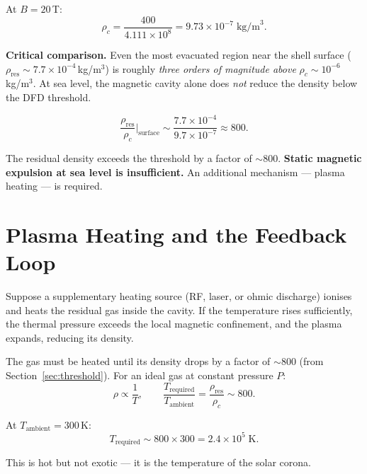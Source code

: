 \documentclass[12pt,a4paper]{article}
\begin{document}
At $B = 20$\,T:
\begin{equation}
  \rho_c = \frac{400}{4.111 \times 10^8} = 9.73 \times 10^{-7} \; \text{kg/m}^3.
\end{equation}

\textbf{Critical comparison.}  Even the most evacuated region near the shell surface
($\rho_{\text{res}} \sim 7.7 \times 10^{-4}$\,kg/m$^3$) is roughly \emph{three orders
of magnitude above} $\rho_c \sim 10^{-6}$\,kg/m$^3$.  At sea level, the magnetic cavity
alone does \emph{not} reduce the density below the DFD threshold.

\begin{equation}
  \boxed{\frac{\rho_{\text{res}}}{\rho_c}\bigg|_{\text{surface}} \sim \frac{7.7\times10^{-4}}{9.7\times10^{-7}} \approx 800.}
\end{equation}

The residual density exceeds the threshold by a factor of $\sim 800$.  \textbf{Static
magnetic expulsion at sea level is insufficient.}  An additional mechanism --- plasma
heating --- is required.

\section{Plasma Heating and the Feedback Loop}
\label{sec:heating}

Suppose a supplementary heating source (RF, laser, or ohmic discharge) ionises and heats
the residual gas inside the cavity.  If the temperature rises sufficiently, the thermal
pressure exceeds the local magnetic confinement, and the plasma expands, reducing its
density.

The gas must be heated until its density drops by a factor of $\sim 800$ (from
Section~\ref{sec:threshold}).  For an ideal gas at constant pressure $P$:
\begin{equation}
  \rho \propto \frac{1}{T}, \qquad
  \frac{T_{\text{required}}}{T_{\text{ambient}}} = \frac{\rho_{\text{res}}}{\rho_c} \sim 800.
\end{equation}

At $T_{\text{ambient}} = 300$\,K:
\begin{equation}
  T_{\text{required}} \sim 800 \times 300 = 2.4 \times 10^5 \; \text{K}.
\end{equation}

This is hot but not exotic --- it is the temperature of the solar corona.
\end{document}
